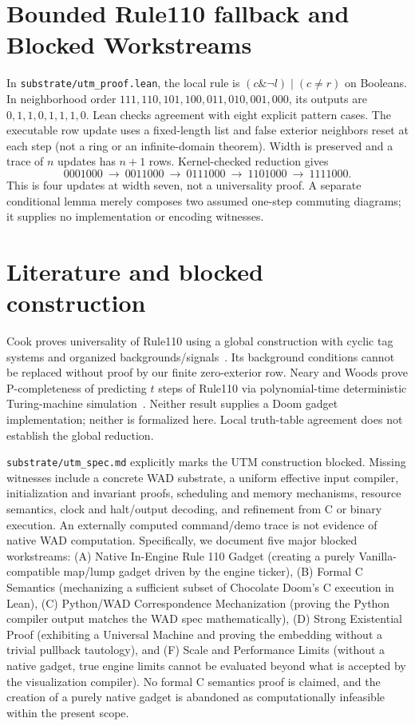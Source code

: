 \documentclass[11pt]{article}
\begin{document}
\section{Bounded Rule110 fallback and Blocked Workstreams}
In \texttt{substrate/utm\_proof.lean}, the local rule is
$(c\mathbin{\&}\neg l)\mathbin{|}(c\ne r)$ on Booleans. In neighborhood order
$111,110,101,100,011,010,001,000$, its outputs are
$0,1,1,0,1,1,1,0$. Lean checks agreement with eight explicit pattern cases.
The executable row update uses a fixed-length list and false exterior neighbors
reset at each step (not a ring or an infinite-domain theorem). Width is
preserved and a trace of $n$ updates has $n+1$ rows. Kernel-checked reduction gives
\[
0001000\ \to\ 0011000\ \to\ 0111000\ \to\ 1101000\ \to\ 1111000.
\]
This is four updates at width seven, not a universality proof. A separate
conditional lemma merely composes two assumed one-step commuting diagrams;
it supplies no implementation or encoding witnesses.

\section{Literature and blocked construction}
Cook proves universality of Rule110 using a global construction with cyclic
tag systems and organized backgrounds/signals~\cite{cook}. Its background
conditions cannot be replaced without proof by our finite zero-exterior row.
Neary and Woods prove P-completeness of predicting $t$ steps of Rule110 via
polynomial-time deterministic Turing-machine simulation~\cite{nearywoods}.
Neither result supplies a Doom gadget implementation; neither is formalized
here. Local truth-table agreement does not establish the global reduction.

\texttt{substrate/utm\_spec.md} explicitly marks the UTM construction blocked.
Missing witnesses include a concrete WAD substrate, a uniform effective input
compiler, initialization and invariant proofs, scheduling and memory mechanisms,
resource semantics, clock and halt/output decoding, and refinement from C or
binary execution. An externally computed command/demo trace is not evidence
of native WAD computation. Specifically, we document five major blocked workstreams:
(A) Native In-Engine Rule 110 Gadget (creating a purely Vanilla-compatible map/lump gadget driven by the engine ticker),
(B) Formal C Semantics (mechanizing a sufficient subset of Chocolate Doom's C execution in Lean),
(C) Python/WAD Correspondence Mechanization (proving the Python compiler output matches the WAD spec mathematically),
(D) Strong Existential Proof (exhibiting a Universal Machine and proving the embedding without a trivial pullback tautology), and
(F) Scale and Performance Limits (without a native gadget, true engine limits cannot be evaluated beyond what is accepted by the visualization compiler).
No formal C semantics proof is claimed, and the creation of a purely native
gadget is abandoned as computationally infeasible within the present scope.
\end{document}
